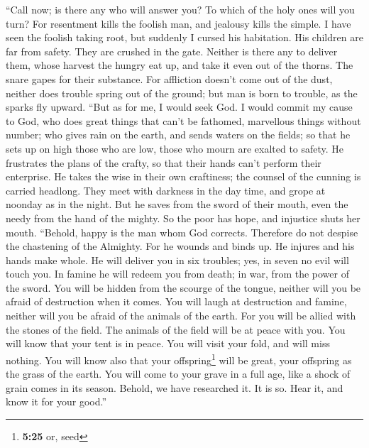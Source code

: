  ``Call now; is there any who will answer you? To which of
the holy ones will you turn?  For resentment kills the
foolish man, and jealousy kills the simple.  I have seen
the foolish taking root, but suddenly I cursed his habitation.
 His children are far from safety. They are crushed in the
gate. Neither is there any to deliver them,  whose harvest
the hungry eat up, and take it even out of the thorns. The snare gapes
for their substance.  For affliction doesn't come out of
the dust, neither does trouble spring out of the ground; 
but man is born to trouble, as the sparks fly upward. 
``But as for me, I would seek God. I would commit my cause to God,
 who does great things that can't be fathomed, marvellous
things without number;  who gives rain on the earth, and
sends waters on the fields;  so that he sets up on high
those who are low, those who mourn are exalted to safety.
 He frustrates the plans of the crafty, so that their
hands can't perform their enterprise.  He takes the wise
in their own craftiness; the counsel of the cunning is carried headlong.
 They meet with darkness in the day time, and grope at
noonday as in the night.  But he saves from the sword of
their mouth, even the needy from the hand of the mighty. 
So the poor has hope, and injustice shuts her mouth. 
``Behold, happy is the man whom God corrects. Therefore do not despise
the chastening of the Almighty.  For he wounds and binds
up. He injures and his hands make whole.  He will deliver
you in six troubles; yes, in seven no evil will touch you.
 In famine he will redeem you from death; in war, from
the power of the sword.  You will be hidden from the
scourge of the tongue, neither will you be afraid of destruction when it
comes.  You will laugh at destruction and famine, neither
will you be afraid of the animals of the earth.  For you
will be allied with the stones of the field. The animals of the field
will be at peace with you.  You will know that your tent
is in peace. You will visit your fold, and will miss nothing.
 You will know also that your offspring\footnote{\textbf{5:25}
  or, seed} will be great, your offspring as the grass of the earth.
 You will come to your grave in a full age, like a shock
of grain comes in its season.  Behold, we have researched
it. It is so. Hear it, and know it for your good.''

